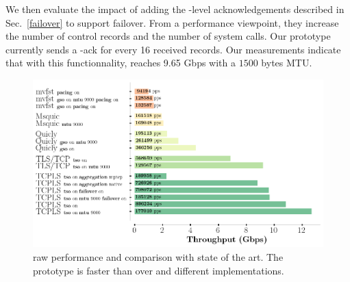 We then evaluate the impact of adding the \tcpls-level acknowledgements
described in Sec.~\ref{failover} to support failover.
From a performance viewpoint, they increase the number of control records and
the number of system calls. Our prototype currently sends a \tcpls-ack for every
16 received records. Our measurements indicate that with this functionnality,
\tcpls reaches 9.65 Gbps with a $1500$ bytes MTU.


\begin{figure}[!t]
  \begin{center}
    \includegraphics[width=\columnwidth]{figures/perf_analysis.png}
  \end{center}
\vspace{-0.5cm}
  \caption{\tcpls raw performance and comparison with state of the art.  The \tcpls prototype is faster than \tls over \tcp and different \quic implementations.}
  \label{fig:perf}
\end{figure}



